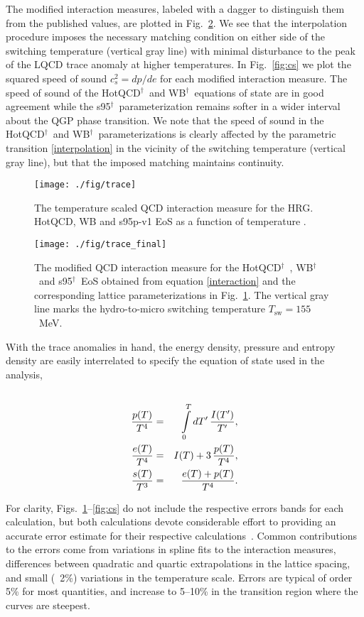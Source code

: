 \documentclass[aps,prc,reprint,amsmath,nofootinbib,superscriptaddress]{revtex4-1}
\newcommand{\hotqcd}{HotQCD$^\dagger$~}
\newcommand{\wb}{WB$^\dagger$~}
\newcommand{\spv}{s95$^\dagger$~}
\begin{document}
The modified interaction measures, labeled with a dagger to distinguish them from the published values, are plotted in Fig.~\ref{fig:trace_final}. 
We see that the interpolation procedure imposes the necessary matching condition on either side of the switching temperature (vertical gray line) with minimal disturbance to the peak of the LQCD trace anomaly at higher temperatures.
In Fig.~\ref{fig:cs} we plot the squared speed of sound $c_s^2 = dp/de$ for each modified interaction measure. The speed of sound of the \hotqcd and \wb equations
of state are in good agreement while the \spv parameterization remains softer in a wider interval about the QGP phase transition. We note that the speed of sound in 
the \hotqcd and \wb parameterizations is clearly affected by the parametric transition \eqref{interpolation} in the vicinity of the switching temperature (vertical gray line), 
but that the imposed matching maintains continuity.

\begin{figure}[t]
  \texttt{[image: ./fig/trace]}
  \caption{\label{fig:trace} The temperature scaled QCD interaction measure for the HRG. HotQCD, WB and s95p-v1 EoS as a function of temperature \cite{Bazavov:2014pvz, Borsanyi:2013bia, Huovinen:2009yb}.}
\end{figure}

\begin{figure}[b]
  \texttt{[image: ./fig/trace\_final]}
  \caption{\label{fig:trace_final} The modified QCD interaction measure for the \hotqcd, \wb and \spv EoS obtained from equation \eqref{interaction} and the corresponding lattice
	  parameterizations in Fig.~\ref{fig:trace}. The vertical gray line marks the hydro-to-micro switching temperature $T_\text{sw} = 155$~MeV.}
\end{figure}

With the trace anomalies in hand, the energy density, pressure and entropy density are easily interrelated to specify the equation of state used in the analysis,
\begin{eqnarray}
 \cr \frac{p(T)}{T^4} &=& \int\limits_0^T dT'\, \frac{I(T')}{T'}, \\
 \frac{e(T)}{T^4} &=& I(T) + 3\, \frac{p(T)}{T^4}, \\
 \frac{s(T)}{T^3} &=& \frac{e(T) + p(T)}{T^4}. 
\end{eqnarray}
 
For clarity, Figs.~\ref{fig:trace}--\ref{fig:cs} do not include the respective errors bands for each calculation, but both calculations devote considerable effort
to providing an accurate error estimate for their respective calculations~\cite{Borsanyi:2013bia,Bazavov:2014pvz}.  Common contributions to the errors
come from variations in spline fits to the interaction measures, differences between quadratic and quartic extrapolations in the lattice spacing, and
small (~2\%) variations in the temperature scale.  Errors are typical of order 5\% for most quantities, and increase to 5--10\% in the transition region
where the curves are steepest.
\end{document}
